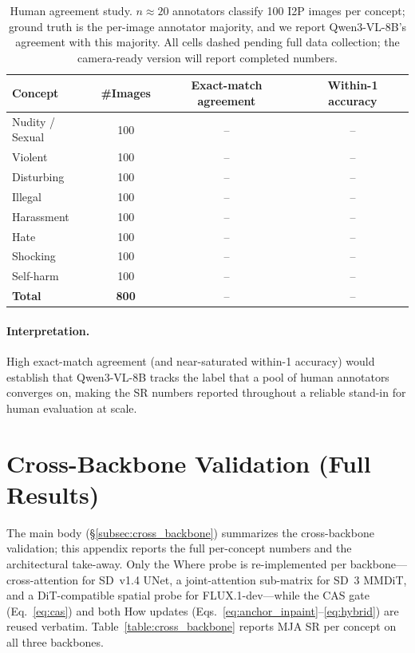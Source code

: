 \begin{table}[h]
\centering
\renewcommand{\arraystretch}{1.15}
\setlength{\tabcolsep}{0.7em}
\caption{Human agreement study. $n{\approx}20$ annotators classify 100 I2P images per concept; ground truth is the per-image annotator majority, and we report Qwen3-VL-8B's agreement with this majority. All cells dashed pending full data collection; the camera-ready version will report completed numbers.}
\label{table:human_study}
\small
\begin{tabular}{@{}lccc@{}}
\toprule
\textbf{Concept} & \textbf{\#Images} & \textbf{Exact-match agreement} & \textbf{Within-1 accuracy} \\
\midrule
Nudity / Sexual & 100 & -- & -- \\
Violent         & 100 & -- & -- \\
Disturbing      & 100 & -- & -- \\
Illegal         & 100 & -- & -- \\
Harassment      & 100 & -- & -- \\
Hate            & 100 & -- & -- \\
Shocking        & 100 & -- & -- \\
Self-harm       & 100 & -- & -- \\
\midrule
\textbf{Total}  & \textbf{800} & -- & -- \\
\bottomrule
\end{tabular}
\end{table}

\paragraph{Interpretation.}
High exact-match agreement (and near-saturated within-1 accuracy) would establish that Qwen3-VL-8B tracks the label that a pool of human annotators converges on, making the SR numbers reported throughout a reliable stand-in for human evaluation at scale.

\section{Cross-Backbone Validation (Full Results)}
\label{app:cross_backbone_full}

The main body (\S\ref{subsec:cross_backbone}) summarizes the cross-backbone validation; this appendix reports the full per-concept numbers and the architectural take-away. Only the Where probe is re-implemented per backbone---cross-attention for SD~v1.4 UNet, a joint-attention sub-matrix for SD~3 MMDiT, and a DiT-compatible spatial probe for FLUX.1-dev---while the CAS gate (Eq.~\ref{eq:cas}) and both How updates (Eqs.~\ref{eq:anchor_inpaint}--\ref{eq:hybrid}) are reused verbatim. Table~\ref{table:cross_backbone} reports MJA SR per concept on all three backbones.

